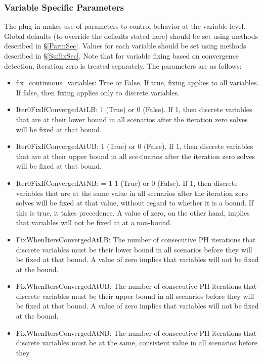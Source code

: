 \subsubsection{Variable Specific Parameters}

The plug-in makes use of parameters to control behavior at the variable level. Global defaults (to override the defaults stated here) should be set using methods described in \S\ref{ParmSec}. Values for each variable should be set using methods described in \S\ref{SuffixSec}.
Note that for variable fixing based on convergence detection, iteration zero is treated separately. The parameters 
are as follows:

\begin{itemize}
\item fix\_continuous\_variables: True or False. If true, fixing applies to all variables. If false, then fixing applies only to discrete variables.
\item Iter0FixIfConvergedAtLB: 1 (True) or 0 (False). If 1, then discrete variables that are at their lower bound in all scenarios after 
the iteration zero solves will be fixed at that bound.
\item Iter0FixIfConvergedAtUB: 1 (True) or 0 (False). If 1, then discrete variables that are at their upper bound in all sce<narios after 
the iteration zero solves will be fixed at that bound.
\item Iter0FixIfConvergedAtNB: = 1  1 (True) or 0 (False). If 1, then discrete variables that are at the same value in all scenarios after 
the iteration zero solves will be fixed at that value, without regard to whether it is a bound. If this is true, it takes precedence. A value of zero, on the other hand, implies that variables will not be fixed at at a non-bound.
\item FixWhenItersConvergedAtLB:  The number of consecutive PH iterations that discrete variables must be their lower bound in all scenarios before they
will be fixed at that bound. A value of zero implies that variables will not be fixed at the bound.
\item FixWhenItersConvergedAtUB: The number of consecutive PH iterations that discrete variables must be their upper bound in all scenarios before they
will be fixed at that bound. A value of zero implies that variables will not be fixed at the bound.
\item FixWhenItersConvergedAtNB: The number of consecutive PH iterations that discrete variables must be at the same, consistent value in all scenarios before they

\end{itemize}
